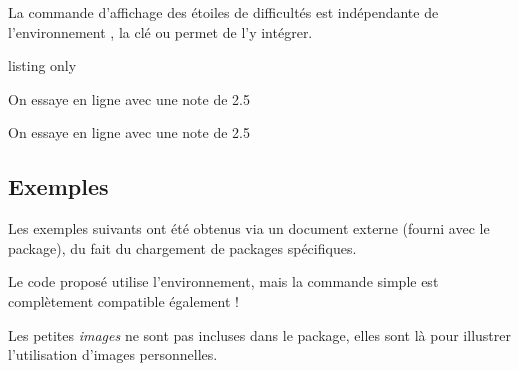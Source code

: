 \documentclass[french,11pt,a4paper]{article}
\begin{document}
La commande d'affichage des étoiles de difficultés est indépendante de l'environnement , la clé  ou  permet de l'y intégrer.

\begin{DemoCode}{listing only}
\end{DemoCode}

\begin{DemoCode}{}
\par
{}\par
\textcolor{teal}{\LARGE{}}\par
{}\par
\end{DemoCode}

\begin{DemoCode}{}
\par
{\LARGE On essaye en ligne  avec une note de 2.5}\par
{\LARGE On essaye en ligne  avec une note de 2.5}\par
{}
\end{DemoCode}

\subsection{Exemples}

Les exemples suivants ont été obtenus via un document externe (fourni avec le package), du fait du chargement de packages spécifiques.

Le code proposé utilise l'environnement, mais la commande simple est complètement compatible également !

\smallskip

{\footnotesize\faExclamationTriangle} Les petites \textit{images} ne sont pas incluses dans le package, elles sont là pour illustrer l'utilisation d'images personnelles.
\end{document}
